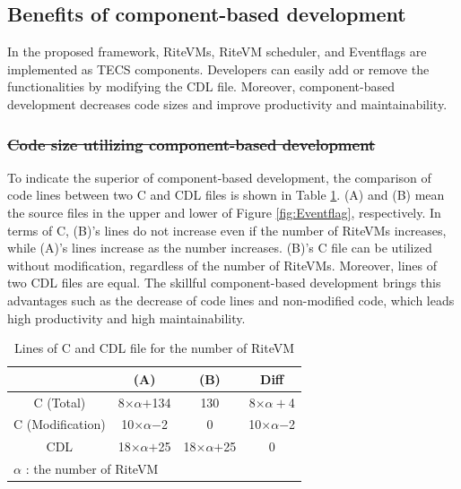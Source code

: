 \documentclass{sig-alternate-05-2015}
\providecommand{\DIFadd}[1]{{\protect\color{blue}\uwave{#1}}} %
\providecommand{\DIFdel}[1]{{\protect\color{red}\sout{#1}}}                      %
\providecommand{\DIFaddbegin}{} %
\providecommand{\DIFaddend}{} %
\providecommand{\DIFdelbegin}{} %
\providecommand{\DIFdelend}{} %
\providecommand{\DIFaddFL}[1]{\DIFadd{#1}} %
\providecommand{\DIFaddbeginFL}{} %
\providecommand{\DIFaddendFL}{} %
\begin{document}
\subsection{Benefits of component-based development}
In the proposed framework, RiteVMs, RiteVM scheduler, and Eventflags are implemented as TECS components.
Developers can easily add or remove the functionalities by modifying the CDL file.
Moreover, component-based development decreases code sizes and improve productivity and maintainability.
\DIFdelbegin \subsubsection{\DIFdel{Code size utilizing component-based development}}
\addtocounter{subsubsection}{-1}%
\DIFdelend \DIFaddbegin 

\DIFaddend To indicate the superior of component-based development, the comparison of code lines between two C and CDL files is shown in Table \ref{tab:codesize}.
(A) and (B) mean the source files in the upper and lower of Figure \ref{fig:Eventflag}, respectively. 
In terms of C, (B)'s \DIFaddbegin \DIFadd{code }\DIFaddend lines do not increase even if the number of RiteVMs increases, while (A)'s \DIFaddbegin \DIFadd{code }\DIFaddend lines increase as the number \DIFaddbegin \DIFadd{of RiteVM }\DIFaddend increases.
(B)'s C file can be utilized without modification, regardless of the number of RiteVMs.
Moreover, \DIFaddbegin \DIFadd{code }\DIFaddend lines of two CDL files are equal.
The skillful component-based development brings this advantages such as the decrease of code lines and non-modified code, which leads high productivity and high maintainability.

\begin{table}[t]
    \centering
    \vspace{1mm}
\caption{\DIFaddbeginFL \DIFaddFL{Code }\DIFaddendFL Lines of C and CDL file for the number of RiteVM}
    \vspace{1mm}
    {\tabcolsep=0.2cm
    \begin{tabular}{c||c|c|c}
                & (A)       & (B)     & Diff  \\ \hline
        C (Total)      & 8$\times$$\alpha$$+$134  & 130     & 8$\times$$\alpha+$4\\
        C (Modification)   & 10$\times\alpha$$-$2 & 0   &  10$\times\alpha$$-$2 \\
        CDL    & 18$\times$$\alpha$$+$25   & 18$\times$$\alpha$$+$25 & 0     \\
        \multicolumn{3}{l}{{\small $\alpha$} : {\scriptsize the number of RiteVM}}
    \end{tabular}
    }
    \label{tab:codesize}
\end{table}
\end{document}
